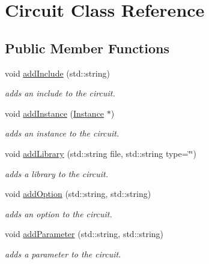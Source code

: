 \hypertarget{class_s_p_i_c_e_1_1_circuit}{}\section{Circuit Class Reference}
\label{class_s_p_i_c_e_1_1_circuit}
\subsection*{Public Member Functions}
\begin{DoxyCompactItemize}
\item 
void \mbox{\hyperlink{class_s_p_i_c_e_1_1_circuit_a30fc53c4da54215fdec3ab1b96ea1943}{add\+Include}} (std\+::string)
\begin{DoxyCompactList}\small\item\em adds an include to the circuit. \end{DoxyCompactList}\item 
void \mbox{\hyperlink{class_s_p_i_c_e_1_1_circuit_a7bb4a4532643568ab1ac2c229185a88e}{add\+Instance}} (\mbox{\hyperlink{class_s_p_i_c_e_1_1_instance}{Instance}} $\ast$)
\begin{DoxyCompactList}\small\item\em adds an instance to the circuit. \end{DoxyCompactList}\item 
void \mbox{\hyperlink{class_s_p_i_c_e_1_1_circuit_a49939060cc1cb8e4bfaf003025032096}{add\+Library}} (std\+::string file, std\+::string type=\char`\"{}\char`\"{})
\begin{DoxyCompactList}\small\item\em adds a library to the circuit. \end{DoxyCompactList}\item 
void \mbox{\hyperlink{class_s_p_i_c_e_1_1_circuit_a1abe34b48e2b6e1834a143fdef159cb9}{add\+Option}} (std\+::string, std\+::string)
\begin{DoxyCompactList}\small\item\em adds an option to the circuit. \end{DoxyCompactList}\item 
void \mbox{\hyperlink{class_s_p_i_c_e_1_1_circuit_ab3ab147a16bc490ce96db905a4ca271c}{add\+Parameter}} (std\+::string, std\+::string)
\begin{DoxyCompactList}\small\item\em adds a parameter to the circuit. \end{DoxyCompactList}\item 

\end{DoxyCompactItemize}
